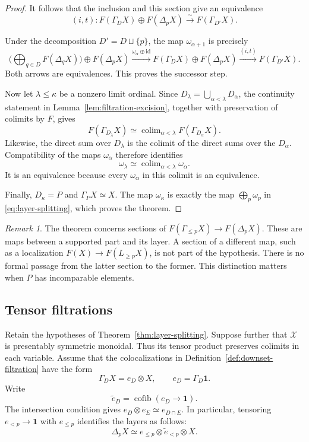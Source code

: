 \documentclass[11pt,reqno]{amsart}
\theoremstyle{definition}
\theoremstyle{remark}
\newtheorem{remark}[theorem]{Remark}
\theoremstyle{plain}
\numberwithin{equation}{section}
\newcommand{\one}{\mathbf 1}
\DeclareMathOperator{\cofib}{cofib}
\DeclareMathOperator*{\colim}{colim}
\begin{document}
\begin{proof}
It follows that the inclusion and this section give an equivalence
\[
 (i,t):
 F(\Gamma_DX)\oplus F(\Delta_pX)
 \xrightarrow{\;\sim\;}F(\Gamma_{D'}X).
\]

Under the decomposition \(D'=D\sqcup\{p\}\), the map
\(\omega_{\alpha+1}\) is precisely
\[
 \biggl(\bigoplus_{q\in D}F(\Delta_qX)\biggr)
       \oplus F(\Delta_pX)
 \xrightarrow{\omega_\alpha\oplus\mathrm{id}}
 F(\Gamma_DX)\oplus F(\Delta_pX)
 \xrightarrow{(i,t)}
 F(\Gamma_{D'}X).
\]
Both arrows are equivalences. This proves the successor step.

Now let \(\lambda\leq\kappa\) be a nonzero limit ordinal.
Since \(D_\lambda=\bigcup_{\alpha<\lambda}D_\alpha\),
the continuity statement in
Lemma~\ref{lem:filtration-excision}, together with preservation
of colimits by \(F\), gives
\[
 F(\Gamma_{D_\lambda}X)
 \simeq
 \colim_{\alpha<\lambda}F(\Gamma_{D_\alpha}X).
\]
Likewise, the direct sum over \(D_\lambda\) is the colimit of
the direct sums over the \(D_\alpha\). Compatibility of the
maps \(\omega_\alpha\) therefore identifies
\[
 \omega_\lambda
 \simeq\colim_{\alpha<\lambda}\omega_\alpha.
\]
It is an equivalence because every \(\omega_\alpha\) in this
colimit is an equivalence.

Finally, \(D_\kappa=P\) and \(\Gamma_PX\simeq X\).
The map \(\omega_\kappa\) is exactly the map
\(\bigoplus_p\omega_p\) in \eqref{eq:layer-splitting},
which proves the theorem.
\end{proof}

\begin{remark}
The theorem concerns sections of
\(F(\Gamma_{\leq p}X)\to F(\Delta_pX)\).
These are maps between a supported part and its layer.
A section of a different map, such as a localization
\(F(X)\to F(L_{\geq p}X)\), is not part of the hypothesis.
There is no formal passage from the latter section to the former.
This distinction matters when \(P\) has incomparable elements.
\end{remark}

\subsection{Tensor filtrations}

Retain the hypotheses of Theorem~\ref{thm:layer-splitting}.
Suppose further that \(\mathcal X\) is presentably symmetric monoidal.
Thus its tensor product preserves colimits in each variable.
Assume that the colocalizations in
Definition~\ref{def:downset-filtration} have the form
\[
 \Gamma_DX=e_D\otimes X,
 \qquad e_D=\Gamma_D\one.
\]
Write
\[
 \widetilde e_D=\cofib(e_D\longrightarrow\one).
\]
The intersection condition gives
\(e_D\otimes e_E\simeq e_{D\cap E}\).
In particular, tensoring \(e_{<p}\to\one\) with \(e_{\leq p}\)
identifies the layers as follows:
\begin{equation}
\label{eq:tensor-layer}
 \Delta_pX
 \simeq
 e_{\leq p}\otimes\widetilde e_{<p}\otimes X.
\end{equation}
\end{document}
